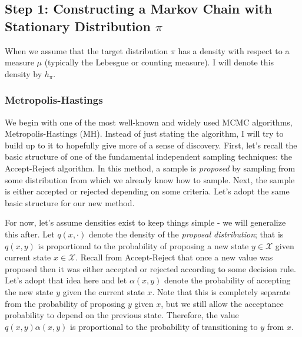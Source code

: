 \documentclass[12pt]{article}
\begin{document}
\subsection{Step 1: Constructing a Markov Chain with Stationary Distribution $\pi$}
When we assume that the target distribution $\pi$ has a density with respect to a measure $\mu$ (typically the Lebesgue or counting measure).
I will denote this density by $h_\pi$. 

\subsubsection{Metropolis-Hastings}
We begin with one of the most well-known and widely used MCMC algorithms, Metropolis-Hastings (MH). Instead of just stating the algorithm, I will 
try to build up to it to hopefully give more of a sense of discovery. First, let's recall the basic structure of one of the fundamental independent sampling
techniques: the Accept-Reject algorithm. In this method, a sample is \textit{proposed} by sampling from some distribution from which we already know how to 
sample. Next, the sample is either accepted or rejected depending on some criteria. Let's adopt the same basic structure for our new method.

For now, let's assume densities exist to keep things simple - we will generalize this after. Let $q(x, \cdot)$ denote the density of the \textit{proposal distribution}; 
that is $q(x, y)$ is proportional to the probability of proposing a new state $y \in \mathcal{X}$ given current state $x \in \mathcal{X}$. Recall from Accept-Reject that 
once a new value was proposed then it was either accepted or rejected according to some decision rule. Let's adopt that idea here and let $\alpha(x, y)$ denote 
the probability of accepting the new state $y$ given the current state $x$. Note that this is completely separate from the probability of proposing $y$ given $x$, but 
we still allow the acceptance probability to depend on the previous state. Therefore, the value $q(x, y)\alpha(x, y)$ is proportional to the probability of transitioning 
to $y$ from $x$. 
\end{document}
